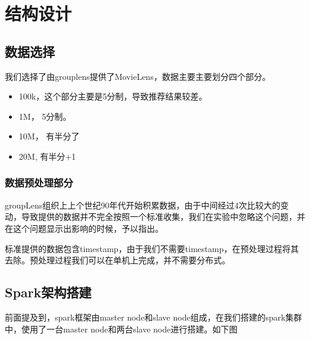 \chapter{结构设计}
\section{数据选择}
我们选择了由grouplens提供了MovieLens，数据主要主要划分四个部分。
\begin{itemize}
    \item 100k，这个部分主要是5分制，导致推荐结果较差。
    \item 1M， 5分制。
    \item 10M， 有半分了
    \item 20M, 有半分+1
\end{itemize}

\subsection{数据预处理部分}
groupLens组织上上个世纪90年代开始积累数据，由于中间经过4次比较大的变动，导致提供的数据并不完全按照一个标准收集，我们在实验中忽略这个问题，并在这个问题显示出影响的时候，予以指出。

标准提供的数据包含timestamp，由于我们不需要timestamp，在预处理过程将其去除。预处理过程我们可以在单机上完成，并不需要分布式。

\section{Spark架构搭建}
前面提及到，spark框架由master node和slave node组成，在我们搭建的spark集群中，使用了一台master node和两台slave node进行搭建。如下图
